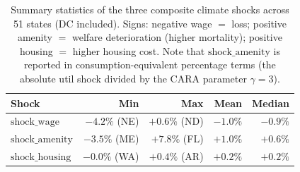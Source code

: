 \begin{table}[!htb]
\centering
\small
\begin{tabular}{lrrrr}
\toprule
\textbf{Shock} & \textbf{Min} & \textbf{Max} & \textbf{Mean} & \textbf{Median} \\
\midrule
$\text{shock\_wage}$    & $-4.2\%$ (NE) & $+0.6\%$ (ND) & $-1.0\%$ & $-0.9\%$ \\
$\text{shock\_amenity}$ & $-3.5\%$ (ME) & $+7.8\%$ (FL) & $+1.0\%$ & $+0.6\%$ \\
$\text{shock\_housing}$ & $-0.0\%$ (WA) & $+0.4\%$ (AR) & $+0.2\%$ & $+0.2\%$ \\
\bottomrule
\end{tabular}
\caption{Summary statistics of the three composite climate shocks across 51 states (DC included). Signs: negative wage $=$ loss; positive amenity $=$ welfare deterioration (higher mortality); positive housing $=$ higher housing cost. Note that $\text{shock\_amenity}$ is reported in consumption-equivalent percentage terms (the absolute util shock divided by the CARA parameter $\gamma = 3$).}
\label{tab:shock_magnitudes}
\end{table}